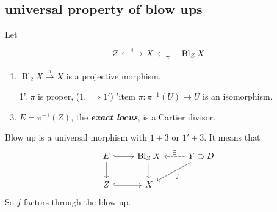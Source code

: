 \documentclass{article}
\DeclareMathOperator{\Bl}{Bl}
\begin{document}
\subsection{universal property of blow ups}
Let
\[\begin{tikzcd}
	Z\arrow[r,hook,"i"]&X&\Bl_ZX\arrow[l,"\pi"]
\end{tikzcd}\]
\begin{enumerate}
	\item $\Bl_2X\overset{\pi}{\to}X$ is a projective morphism.
	\item[1'.] $\pi$ is proper, ($1.\implies1'$)
	'item $\pi:\pi^{-1}(U)\to U$ is an isomorphism.
	\item $E=\pi^{-1}(Z)$, the \textbf{\textit{exact locus}}, is a Cartier divisor.
\end{enumerate}
\begin{prop}
	Blow up is a universal morphism with $1+3$ or $1'+3$. It means that
	\[\begin{tikzcd}
		E\arrow[r,hook]\arrow[d]&\Bl_ZX\arrow[d]&Y\supset D\arrow[l,dashed,swap,"\exists"]\arrow[dl,"f"]\\
		Z\arrow[r,hook]&X
	\end{tikzcd}\]
	So $f$ factors through the blow up.
\end{prop}
\clearpage
{}
\printbibliography
\end{document}
